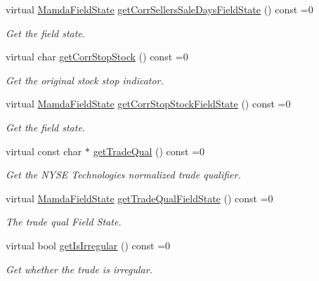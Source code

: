 \begin{CompactItemize}
virtual \hyperlink{namespaceWombat_93aac974f2ab713554fd12a1fa3b7d2a}{Mamda\-Field\-State} \hyperlink{classWombat_1_1MamdaTradeCorrection_2a2041c29588e9bec281fba8b942e031}{get\-Corr\-Sellers\-Sale\-Days\-Field\-State} () const =0
\begin{CompactList}\small\item\em Get the field state. \item\end{CompactList}\item 
virtual char \hyperlink{classWombat_1_1MamdaTradeCorrection_ab10389dc4e9d523491374ac67e4024a}{get\-Corr\-Stop\-Stock} () const =0
\begin{CompactList}\small\item\em Get the original stock stop indicator. \item\end{CompactList}\item 
virtual \hyperlink{namespaceWombat_93aac974f2ab713554fd12a1fa3b7d2a}{Mamda\-Field\-State} \hyperlink{classWombat_1_1MamdaTradeCorrection_90f75c0681775f5b3d473a3154d91676}{get\-Corr\-Stop\-Stock\-Field\-State} () const =0
\begin{CompactList}\small\item\em Get the field state. \item\end{CompactList}\item 
virtual const char $\ast$ \hyperlink{classWombat_1_1MamdaTradeCorrection_f8a227326bbe7e5b948a1e573b92a2b4}{get\-Trade\-Qual} () const =0
\begin{CompactList}\small\item\em Get the NYSE Technologies normalized trade qualifier. \item\end{CompactList}\item 
virtual \hyperlink{namespaceWombat_93aac974f2ab713554fd12a1fa3b7d2a}{Mamda\-Field\-State} \hyperlink{classWombat_1_1MamdaTradeCorrection_2a479b3bec5090dab27b8131112676d4}{get\-Trade\-Qual\-Field\-State} () const =0
\begin{CompactList}\small\item\em The trade qual Field State. \item\end{CompactList}\item 
virtual bool \hyperlink{classWombat_1_1MamdaTradeCorrection_93bee89c9e9aad779b055f2d168c2283}{get\-Is\-Irregular} () const =0
\begin{CompactList}\small\item\em Get whether the trade is irregular. \item\end{CompactList}\item 

\end{CompactItemize}
